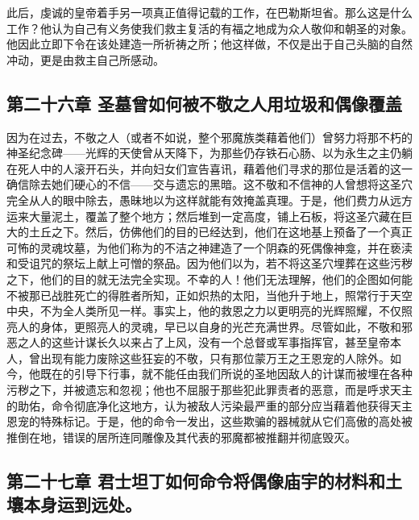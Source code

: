 此后，虔诚的皇帝着手另一项真正值得记载的工作，在巴勒斯坦省。那么这是什么工作？他认为自己有义务使我们救主复活的有福之地成为众人敬仰和朝圣的对象。他因此立即下令在该处建造一所祈祷之所；他这样做，不仅是出于自己头脑的自然冲动，更是由救主自己所感动。\par


\subsection{第二十六章 圣墓曾如何被不敬之人用垃圾和偶像覆盖}

因为在过去，不敬之人（或者不如说，整个邪魔族类藉着他们）曾努力将那不朽的神圣纪念碑——光辉的天使曾从天降下，为那些仍存铁石心肠、以为永生之主仍躺在死人中的人滚开石头，并向妇女们宣告喜讯，藉着他们寻求的那位是活着的这一确信除去她们硬心的不信——交与遗忘的黑暗。这不敬和不信神的人曾想将这圣穴完全从人的眼中除去，愚昧地以为这样就能有效掩盖真理。于是，他们费力从远方运来大量泥土，覆盖了整个地方；然后堆到一定高度，铺上石板，将这圣穴藏在巨大的土丘之下。然后，仿佛他们的目的已经达到，他们在这地基上预备了一个真正可怖的灵魂坟墓，为他们称为的不洁之神建造了一个阴森的死偶像神龛，并在亵渎和受诅咒的祭坛上献上可憎的祭品。因为他们以为，若不将这圣穴埋葬在这些污秽之下，他们的目的就无法完全实现。不幸的人！他们无法理解，他们的企图如何能不被那已战胜死亡的得胜者所知，正如炽热的太阳，当他升于地上，照常行于天空中央，不为全人类所见一样。事实上，他的救恩之力以更明亮的光辉照耀，不仅照亮人的身体，更照亮人的灵魂，早已以自身的光芒充满世界。尽管如此，不敬和邪恶之人的这些计谋长久以来占了上风，没有一个总督或军事指挥官，甚至皇帝本人，曾出现有能力废除这些狂妄的不敬，只有那位蒙万王之王恩宠的人除外。如今，他既在的引导下行事，就不能任由我们所说的圣地因敌人的计谋而被埋在各种污秽之下，并被遗忘和忽视；他也不屈服于那些犯此罪责者的恶意，而是呼求天主的助佑，命令彻底净化这地方，认为被敌人污染最严重的部分应当藉着他获得天主恩宠的特殊标记。于是，他的命令一发出，这些欺骗的器械就从它们高傲的高处被推倒在地，错误的居所连同雕像及其代表的邪魔都被推翻并彻底毁灭。\par


\subsection{第二十七章 君士坦丁如何命令将偶像庙宇的材料和土壤本身运到远处。}

